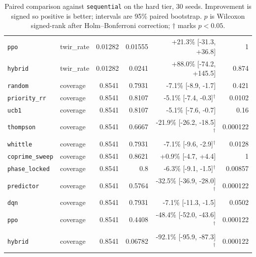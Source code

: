 \begin{table}[t]
\begin{tabular}{llrrrr}
    \texttt{ppo} & twir\_rate & 0.01282 & 0.01555 & +21.3\% [-31.3, +36.8] & 1 \\
    \texttt{hybrid} & twir\_rate & 0.01282 & 0.0241 & +88.0\% [-74.2, +145.5] & 0.874 \\
    \midrule
    \texttt{random} & coverage & 0.8541 & 0.7931 & -7.1\% [-8.9, -1.7] & 0.421 \\
    \texttt{priority\_rr} & coverage & 0.8541 & 0.8107 & -5.1\% [-7.4, -0.3]$^{\dagger}$ & 0.0102 \\
    \texttt{ucb1} & coverage & 0.8541 & 0.8107 & -5.1\% [-7.6, -0.7] & 0.16 \\
    \texttt{thompson} & coverage & 0.8541 & 0.6667 & -21.9\% [-26.2, -18.5]$^{\dagger}$ & 0.000122 \\
    \texttt{whittle} & coverage & 0.8541 & 0.7931 & -7.1\% [-9.6, -2.9]$^{\dagger}$ & 0.0128 \\
    \texttt{coprime\_sweep} & coverage & 0.8541 & 0.8621 & +0.9\% [-4.7, +4.4] & 1 \\
    \texttt{phase\_locked} & coverage & 0.8541 & 0.8 & -6.3\% [-9.1, -1.5]$^{\dagger}$ & 0.00857 \\
    \texttt{predictor} & coverage & 0.8541 & 0.5764 & -32.5\% [-36.9, -28.0]$^{\dagger}$ & 0.000122 \\
    \texttt{dqn} & coverage & 0.8541 & 0.7931 & -7.1\% [-11.3, -1.5] & 0.0502 \\
    \texttt{ppo} & coverage & 0.8541 & 0.4408 & -48.4\% [-52.0, -43.6]$^{\dagger}$ & 0.000122 \\
    \texttt{hybrid} & coverage & 0.8541 & 0.06782 & -92.1\% [-95.9, -87.3]$^{\dagger}$ & 0.000122 \\
    \bottomrule
  \end{tabular}
  \caption{Paired comparison against \texttt{sequential} on the hard tier, 30 seeds. Improvement is signed so positive is better; intervals are 95\% paired bootstrap. $p$ is Wilcoxon signed-rank after Holm--Bonferroni correction; $\dagger$ marks $p < 0.05$.}
  \label{tab:leaderboard-hard}
\end{table}
